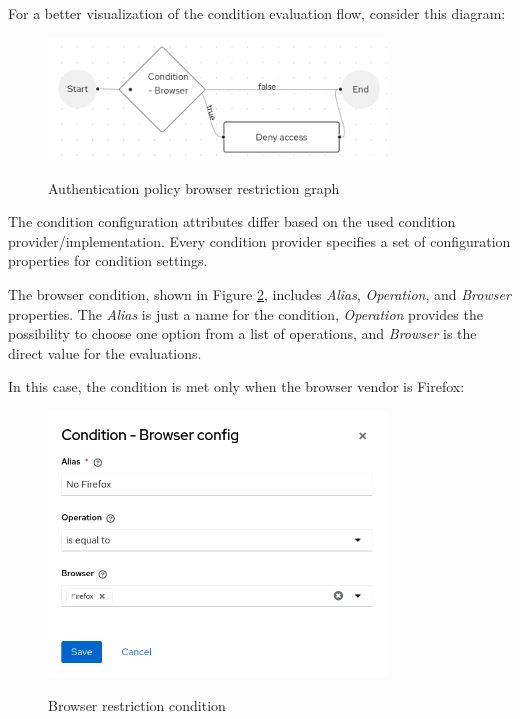 For a better visualization of the condition evaluation flow, consider this diagram:

\begin{figure}[htbp]
  \centering
  \includegraphics[width=0.8\textwidth]{img/sections/5-design/policy-browser-flow-graph.png}
  \label{fig:design-policy-browser-flow-graph}
  \caption{Authentication policy browser restriction graph}
\end{figure}

The condition configuration attributes differ based on the used condition provider/implementation.
Every condition provider specifies a set of configuration properties for condition settings.

The browser condition, shown in Figure \ref{fig:design-policy-browser-flow-condition}, includes \textit{Alias}, \textit{Operation}, and \textit{Browser} properties.
The \textit{Alias} is just a name for the condition, \textit{Operation} provides the possibility to choose one option from a list of operations, and \textit{Browser} is the direct value for the evaluations.

In this case, the condition is met only when the browser vendor is Firefox:

\begin{figure}[htbp]
  \centering
  \includegraphics[width=0.8\textwidth]{img/sections/5-design/policy-browser-condition.png}
  \label{fig:design-policy-browser-flow-condition}
  \caption{Browser restriction condition}
\end{figure}

